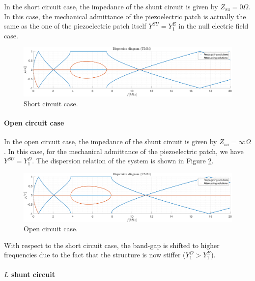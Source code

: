 In the short circuit case, the impedance of the shunt circuit is given by $Z_{su} = 0 \Omega$.
In this case, the mechanical admittance of the piezoelectric patch is actually the same as the one of the piezoelectric patch itself $Y^{SU} = Y_1^E$ in the null electric field case.

\begin{figure}[H]
    \centering
    \includegraphics[width=\textwidth]{./img/MATLAB/TMM_ON-ON-ON_OFF_R1000_L0.015_C5e-09.pdf}
    \caption{Short circuit case.}
    \label{fig:TMM_ON-ON-ON_OFF_R1000_L0.015_C5e-09.pdf}
\end{figure}


\paragraph{Open circuit case}

In the open circuit case, the impedance of the shunt circuit is given by $Z_{su} = \infty \Omega$.
In this case, for the mechanical admittance of the piezoelectric patch, we have $Y^{SU} = Y_1^D$.
The dispersion relation of the system is shown in Figure \ref{fig:TMM_ON-ON-ON_+inf_R1000_L0.015_C5e-09.pdf}.

\begin{figure}[H]
    \centering
    \includegraphics[width=\textwidth]{./img/MATLAB/TMM_ON-ON-ON_+inf_R1000_L0.015_C5e-09.pdf}
    \caption{Open circuit case.}
    \label{fig:TMM_ON-ON-ON_+inf_R1000_L0.015_C5e-09.pdf}
\end{figure}

With respect to the short circuit case, the band-gap is shifted to higher frequencies due to the fact that the structure is now stiffer ($Y_1^D > Y_1^E$).


\paragraph{$L$ shunt circuit}


